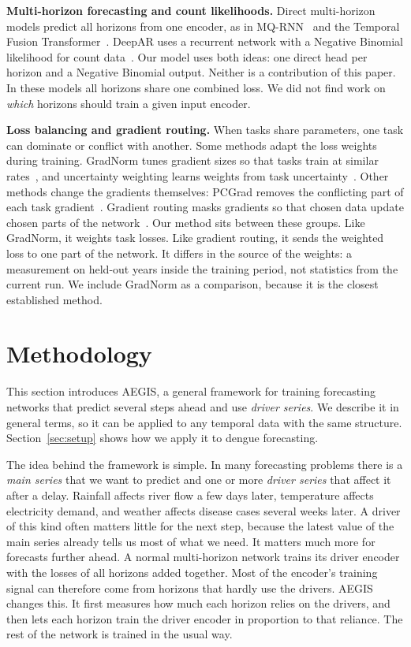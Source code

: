 \documentclass[conference]{IEEEtran}
\newcommand{\fw}{AEGIS}
\begin{document}
\textbf{Multi-horizon forecasting and count likelihoods.} Direct multi-horizon models predict all horizons from one encoder, as in MQ-RNN~\cite{wen2017mqrnn} and the Temporal Fusion Transformer~\cite{lim2021tft}. DeepAR uses a recurrent network with a Negative Binomial likelihood for count data~\cite{salinas2020deepar}. Our model uses both ideas: one direct head per horizon and a Negative Binomial output. Neither is a contribution of this paper. In these models all horizons share one combined loss. We did not find work on \emph{which} horizons should train a given input encoder.

\textbf{Loss balancing and gradient routing.} When tasks share parameters, one task can dominate or conflict with another. Some methods adapt the loss weights during training. GradNorm tunes gradient sizes so that tasks train at similar rates~\cite{chen2018gradnorm}, and uncertainty weighting learns weights from task uncertainty~\cite{kendall2018multi}. Other methods change the gradients themselves: PCGrad removes the conflicting part of each task gradient~\cite{yu2020pcgrad}. Gradient routing masks gradients so that chosen data update chosen parts of the network~\cite{cloud2024gradient}. Our method sits between these groups. Like GradNorm, it weights task losses. Like gradient routing, it sends the weighted loss to one part of the network. It differs in the source of the weights: a measurement on held-out years inside the training period, not statistics from the current run. We include GradNorm as a comparison, because it is the closest established method.

\section{Methodology}

This section introduces \fw{}, a general framework for training forecasting networks that predict several steps ahead and use \emph{driver series}. We describe it in general terms, so it can be applied to any temporal data with the same structure. Section~\ref{sec:setup} shows how we apply it to dengue forecasting.

The idea behind the framework is simple. In many forecasting problems there is a \emph{main series} that we want to predict and one or more \emph{driver series} that affect it after a delay. Rainfall affects river flow a few days later, temperature affects electricity demand, and weather affects disease cases several weeks later. A driver of this kind often matters little for the next step, because the latest value of the main series already tells us most of what we need. It matters much more for forecasts further ahead. A normal multi-horizon network trains its driver encoder with the losses of all horizons added together. Most of the encoder's training signal can therefore come from horizons that hardly use the drivers. \fw{} changes this. It first measures how much each horizon relies on the drivers, and then lets each horizon train the driver encoder in proportion to that reliance. The rest of the network is trained in the usual way.
\end{document}
